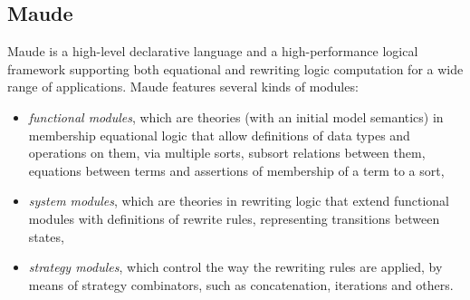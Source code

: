 \subsection{Maude}

Maude \cite{DBLP:conf/maude/2007} is a high-level declarative
language and 
a high-performance logical framework supporting both equational and rewriting logic computation for a wide range of applications. 
Maude features several kinds of modules:
\begin{itemize}
\item \emph{functional modules}, which are theories (with an initial
model semantics) in 
membership equational logic that allow definitions of 
data types and operations on them, via multiple sorts, subsort
relations between them, equations between terms and
assertions of membership of a term to a sort,
\item \emph{system modules}, which are theories in rewriting logic
that extend functional modules with
definitions of rewrite rules, representing transitions between states,
\item \emph{strategy modules}, which control 
the way the rewriting rules are applied, by means of strategy combinators,
such as concatenation, iterations and others.
\end{itemize}

